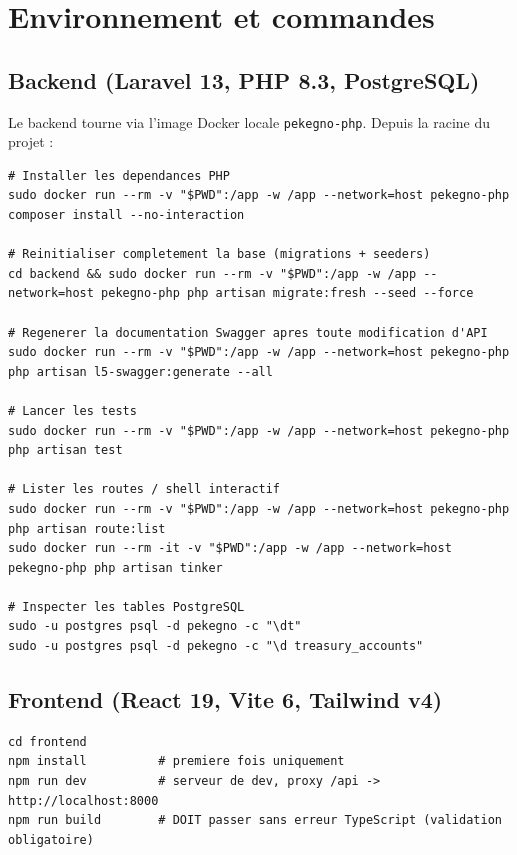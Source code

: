 \documentclass[11pt,a4paper]{article}
\begin{document}
\section{Environnement et commandes}

\subsection{Backend (Laravel 13, PHP 8.3, PostgreSQL)}

Le backend tourne via l'image Docker locale \verb|pekegno-php|. Depuis la racine du projet :

\begin{lstlisting}
# Installer les dependances PHP
sudo docker run --rm -v "$PWD":/app -w /app --network=host pekegno-php composer install --no-interaction

# Reinitialiser completement la base (migrations + seeders)
cd backend && sudo docker run --rm -v "$PWD":/app -w /app --network=host pekegno-php php artisan migrate:fresh --seed --force

# Regenerer la documentation Swagger apres toute modification d'API
sudo docker run --rm -v "$PWD":/app -w /app --network=host pekegno-php php artisan l5-swagger:generate --all

# Lancer les tests
sudo docker run --rm -v "$PWD":/app -w /app --network=host pekegno-php php artisan test

# Lister les routes / shell interactif
sudo docker run --rm -v "$PWD":/app -w /app --network=host pekegno-php php artisan route:list
sudo docker run --rm -it -v "$PWD":/app -w /app --network=host pekegno-php php artisan tinker

# Inspecter les tables PostgreSQL
sudo -u postgres psql -d pekegno -c "\dt"
sudo -u postgres psql -d pekegno -c "\d treasury_accounts"
\end{lstlisting}

\subsection{Frontend (React 19, Vite 6, Tailwind v4)}

\begin{lstlisting}
cd frontend
npm install          # premiere fois uniquement
npm run dev          # serveur de dev, proxy /api -> http://localhost:8000
npm run build        # DOIT passer sans erreur TypeScript (validation obligatoire)
\end{lstlisting}
\end{document}
